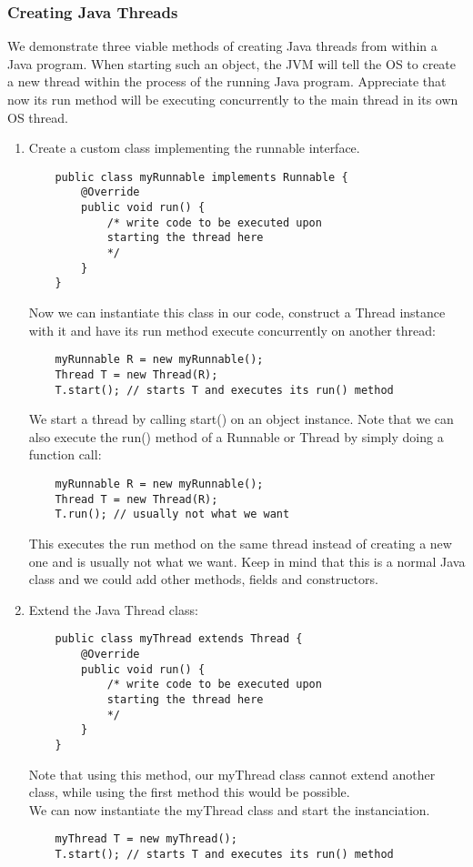 \documentclass[main]{subfiles}
\begin{document}
\subsubsection{Creating Java Threads}
We demonstrate three viable methods of creating Java threads from within a Java program. When starting such an object, the JVM will tell the OS to create a new thread within the process of the running Java program. Appreciate that now its run method will be executing concurrently to the main thread in its own OS thread.
\begin{enumerate}
    \item Create a custom class implementing the runnable interface.
    \begin{verbatim}
    public class myRunnable implements Runnable {
        @Override
        public void run() {
            /* write code to be executed upon
            starting the thread here
            */
        }
    }
    \end{verbatim}
    Now we can instantiate this class in our code, construct a Thread instance with it and have its run method execute concurrently on another thread:
    \begin{verbatim}
    myRunnable R = new myRunnable();
    Thread T = new Thread(R);
    T.start(); // starts T and executes its run() method
    \end{verbatim}
    We start a thread by calling start() on an object instance. Note that we can also execute the run() method of a Runnable or Thread by simply doing a function call:
    \begin{verbatim}
    myRunnable R = new myRunnable();
    Thread T = new Thread(R);
    T.run(); // usually not what we want
    \end{verbatim}
    This executes the run method on the same thread instead of creating a new one and is usually not what we want.
    Keep in mind that this is a normal Java class and we could add other methods, fields and constructors.

    \item Extend the Java Thread class:
    \begin{verbatim}
    public class myThread extends Thread {
        @Override
        public void run() {
            /* write code to be executed upon
            starting the thread here
            */
        }
    }
    \end{verbatim}
    Note that using this method, our myThread class cannot extend another class, while using the first method this would be possible.\\
    We can now instantiate the myThread class and start the instanciation.
    \begin{verbatim}
    myThread T = new myThread();
    T.start(); // starts T and executes its run() method
    \end{verbatim}


\end{enumerate}
\end{document}
